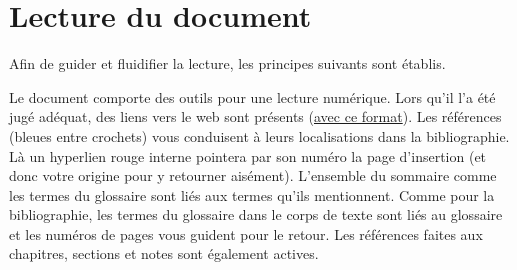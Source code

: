 \section*{Lecture du document}

Afin de guider et fluidifier la lecture, les principes suivants sont établis.

Le document comporte des outils pour une lecture numérique.
Lors qu'il l'a été jugé adéquat, des liens vers le web sont présents (\href{https://duckduckgo.com}{avec ce format}).
Les références (bleues entre crochets) vous conduisent à leurs localisations dans la bibliographie.
Là un hyperlien rouge interne pointera par son numéro la page d'insertion (et donc votre origine pour y retourner aisément).
L'ensemble du sommaire comme les termes du glossaire sont liés aux termes qu'ils mentionnent.
Comme pour la bibliographie, les termes du glossaire dans le corps de texte sont liés au glossaire et les numéros de pages vous guident pour le retour.
Les références faites aux chapitres, sections et notes sont également actives.
